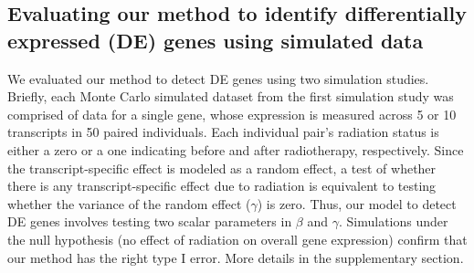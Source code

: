 \documentclass[hidelinks,11pt]{article}
\begin{document}
\subsection*{Evaluating our method to identify differentially expressed (DE) genes using simulated data}
We evaluated our method to detect DE genes using two simulation studies. Briefly, each Monte Carlo simulated dataset from the first simulation study was comprised of data for a single gene, whose expression is measured across 5 or 10 transcripts in 50 paired individuals. Each individual pair's radiation status is either a zero or a one indicating before and after radiotherapy, respectively. Since the transcript-specific effect is modeled as a random effect, a test of whether there is any transcript-specific effect due to radiation is equivalent to testing whether the variance of the random effect ($\gamma$) is zero. Thus, our model to detect DE genes involves testing two scalar parameters in $\beta$ and $\gamma$. Simulations under the null hypothesis (no effect of radiation on overall gene expression) confirm that our method has the right type I error. More details in the supplementary section. 
\end{document}
